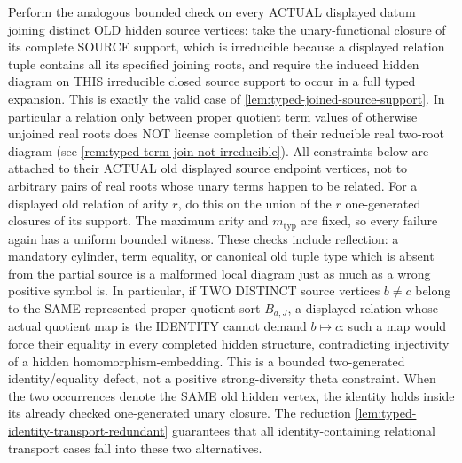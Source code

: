 \begin{construction}
Perform the analogous bounded check on every ACTUAL displayed datum
joining distinct OLD hidden source vertices: take the unary-functional
closure of its complete SOURCE support, which is irreducible because
a displayed relation tuple contains all its specified joining roots,
and require the induced hidden diagram on THIS irreducible
closed source support to occur in a full typed expansion.
This is exactly the valid case of
\cref{lem:typed-joined-source-support}.
In particular a relation only between proper quotient
term values of otherwise unjoined real roots does
NOT license completion of their reducible real two-root diagram
(see \cref{rem:typed-term-join-not-irreducible}).
All constraints below are attached to their ACTUAL old
displayed source endpoint vertices, not to arbitrary pairs
of real roots whose unary terms happen to be related.  For a displayed old relation of arity \(r\), do this on the union
of the \(r\) one-generated closures of its support.  The maximum arity and
\(m_{\mathrm{typ}}\) are fixed, so every failure again has a uniform bounded
witness.  These checks include reflection: a mandatory cylinder, term
equality, or canonical old tuple type which is absent from the partial source
is a malformed local diagram just as much as a wrong positive symbol is.
In particular, if TWO DISTINCT source vertices \(b\ne c\)
belong to the SAME represented proper quotient sort
\(B_{a,J}\), a displayed relation whose actual
quotient map is the IDENTITY cannot demand
\(b\mapsto c\): such a map would force their
equality in every completed hidden structure,
contradicting injectivity of a hidden
homomorphism-embedding. This is a bounded
two-generated identity/equality defect,
not a positive strong-diversity theta constraint.
When the two occurrences denote the SAME old
hidden vertex, the identity holds inside its
already checked one-generated unary closure.
The reduction
\cref{lem:typed-identity-transport-redundant}
guarantees that all identity-containing
relational transport cases fall into these
two alternatives.


\end{construction}
